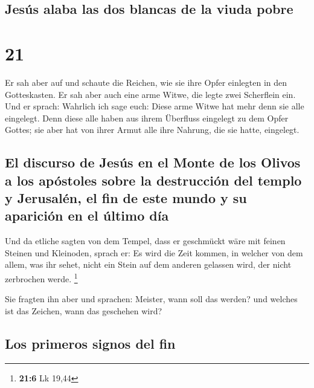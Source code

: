 \hypertarget{jesuxfas-alaba-las-dos-blancas-de-la-viuda-pobre}{%
\subsection{Jesús alaba las dos blancas de la viuda
pobre}\label{jesuxfas-alaba-las-dos-blancas-de-la-viuda-pobre}}

\hypertarget{section-20}{%
\section{21}\label{section-20}}

 Er sah aber auf und schaute die Reichen, wie sie ihre
Opfer einlegten in den Gotteskasten.  Er sah aber auch
eine arme Witwe, die legte zwei Scherflein ein.  Und er
sprach: Wahrlich ich sage euch: Diese arme Witwe hat mehr denn sie alle
eingelegt.  Denn diese alle haben aus ihrem Überfluss
eingelegt zu dem Opfer Gottes; sie aber hat von ihrer Armut alle ihre
Nahrung, die sie hatte, eingelegt.

\hypertarget{el-discurso-de-jesuxfas-en-el-monte-de-los-olivos-a-los-apuxf3stoles-sobre-la-destrucciuxf3n-del-templo-y-jerusaluxe9n-el-fin-de-este-mundo-y-su-apariciuxf3n-en-el-uxfaltimo-duxeda}{%
\subsection{El discurso de Jesús en el Monte de los Olivos a los
apóstoles sobre la destrucción del templo y Jerusalén, el fin de este
mundo y su aparición en el último
día}\label{el-discurso-de-jesuxfas-en-el-monte-de-los-olivos-a-los-apuxf3stoles-sobre-la-destrucciuxf3n-del-templo-y-jerusaluxe9n-el-fin-de-este-mundo-y-su-apariciuxf3n-en-el-uxfaltimo-duxeda}}

 Und da etliche sagten von dem Tempel, dass er geschmückt
wäre mit feinen Steinen und Kleinoden, sprach er:  Es wird
die Zeit kommen, in welcher von dem allem, was ihr sehet, nicht ein
Stein auf dem anderen gelassen wird, der nicht zerbrochen werde.
\footnote{\textbf{21:6} Lk 19,44}

 Sie fragten ihn aber und sprachen: Meister, wann soll das
werden? und welches ist das Zeichen, wann das geschehen wird?

\hypertarget{los-primeros-signos-del-fin}{%
\subsection{Los primeros signos del
fin}\label{los-primeros-signos-del-fin}}

